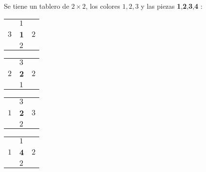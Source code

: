 \documentclass[11pt, a4paper, twoside]{article}
\begin{document}
\begin{ejemplo}

	Se tiene un tablero de $2\times 2$, los colores $1,2,3$ 
    y las piezas \textbf{1},\textbf{2},\textbf{3},\textbf{4} $:$

  \begin{center}
    \begin{minipage}{0.2\textwidth}
        \begin{tabular}{ |l l l|}
            \hline
                 & $1$     &       \\
            $3$  & \textbf{1} &   $2$ \\ 
                 & $2$     &       \\
            \hline
        \end{tabular}
    \end{minipage}
    \begin{minipage}{0.2\textwidth}
        \begin{tabular}{ |l l l|}
            \hline
                 & $3$     &       \\
            $2$  & \textbf{2} & $2$ \\ 
                 & $1$     &       \\
            \hline
        \end{tabular}
    \end{minipage}
    \begin{minipage}{0.2\textwidth}
        \begin{tabular}{ |l l l|}
            \hline
                 & $3$      &       \\
            $1$  & \textbf{2}  & $3$ \\ 
                 & $2$      &       \\
            \hline
        \end{tabular}
    \end{minipage}
    \begin{minipage}{0.2\textwidth}
        \begin{tabular}{ |l l l|}
            \hline
                 & $1$      &       \\
            $1$  & \textbf{4}  & $2$   \\ 
                 & $2$      &       \\
            \hline
        \end{tabular} 
    \end{minipage}
   \end{center}
   

\end{ejemplo}
\end{document}
